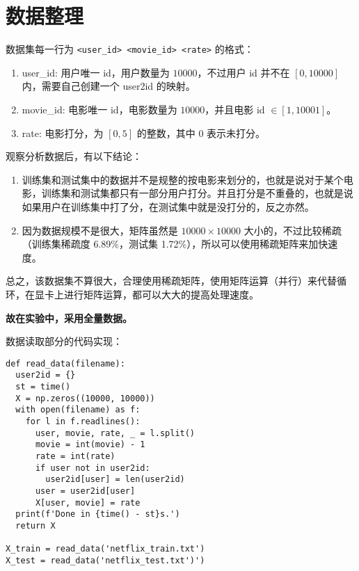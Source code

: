 \documentclass[degree=project, degree-type=project]{thuthesis}
\begin{document}
\maketitle

\frontmatter
% 

\tableofcontents

\mainmatter

\chapter{数据整理}

数据集每一行为 \texttt{<user\_id> <movie\_id> <rate>} 的格式：

\begin{enumerate}
  \item user\_id: 用户唯一 id，用户数量为 $10000$，不过用户 id 并不在 $[0, 10000]$ 内，需要自己创建一个 user2id 的映射。
  \item movie\_id: 电影唯一 id，电影数量为 $10000$，并且电影 id $\in [1, 10001]$。
  \item rate: 电影打分，为 $[0, 5]$ 的整数，其中 $0$ 表示未打分。
\end{enumerate}

观察分析数据后，有以下结论：

\begin{enumerate}
  \item 训练集和测试集中的数据并不是规整的按电影来划分的，也就是说对于某个电影，训练集和测试集都只有一部分用户打分。并且打分是不重叠的，也就是说如果用户在训练集中打了分，在测试集中就是没打分的，反之亦然。
  \item 因为数据规模不是很大，矩阵虽然是 $10000 \times 10000$ 大小的，不过比较稀疏（训练集稀疏度 6.89\%，测试集 1.72\%），所以可以使用稀疏矩阵来加快速度。
\end{enumerate}

总之，该数据集不算很大，合理使用稀疏矩阵，使用矩阵运算（并行）来代替循环，在显卡上进行矩阵运算，都可以大大的提高处理速度。

\textbf{故在实验中，采用全量数据。}

数据读取部分的代码实现：

  \begin{verbatim}
def read_data(filename):
  user2id = {}
  st = time()
  X = np.zeros((10000, 10000))
  with open(filename) as f:
    for l in f.readlines():
      user, movie, rate, _ = l.split()
      movie = int(movie) - 1
      rate = int(rate)
      if user not in user2id:
        user2id[user] = len(user2id)
      user = user2id[user]
      X[user, movie] = rate
  print(f'Done in {time() - st}s.')
  return X

X_train = read_data('netflix_train.txt')
X_test = read_data('netflix_test.txt')')
  \end{verbatim}
\end{document}
